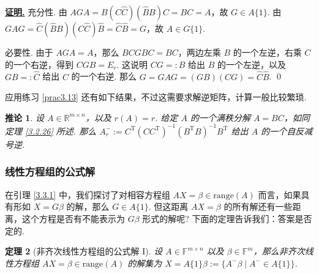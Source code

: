 \documentclass[10pt,openany]{article}
\theoremstyle{thmstyle} %
\newtheorem{theorem}{定理}[subsection]
\theoremstyle{defstyle} %
\newtheorem{corollary}[theorem]{推论}
\theoremstyle{prostyle} %
\theoremstyle{exastyle}
\theoremstyle{remstyle}
\renewenvironment{proof}[1][证明]{\par\underline{\textbf{#1.}} \;\fangsong}{\qed\par}
\newcommand{\T}{^{\text{T}}}
\newcommand{\F}{\mathbb{F}}
\newcommand{\R}{\mathbb{R}}
\newcommand{\mn}{^{m \times n}}
\begin{document}
\begin{proof}
	充分性. 由 \( AGA=B(C\hat{C})(\hat{B}B)C=BC=A \)，故 \( G \in A\{1\} \). 由 \( GAG=\hat{C}(\hat{B}B)(C\hat{C})\hat{B}=\hat{C}\hat{B}=G \)，故 \( A \in G\{1\} \). 
	
	必要性. 由于 \( AGA=A \)，那么 \( BCGBC=BC \)，两边左乘 \( B \) 的一个左逆，右乘 \( C \) 的一个右逆，得到 \( CGB=E_r \). 这说明 \( CG=:\hat{B} \) 给出 \( B \) 的一个左逆，以及 \( GB=:\hat{C} \) 给出 \( C \) 的一个右逆. 那么 \( G=GAG=(GB)(CG)=\hat{C}\hat{B} \).
\end{proof}

应用练习 \ref{prac3.13} 还有如下结果，不过这需要求解逆矩阵，计算一般比较繁琐.

\begin{corollary}
	设 \( A \in \R\mn \)，以及 \( r(A)=r \). 给定 \( A \) 的一个满秩分解 \( A=BC \)，如同定理 \ref{3.2.26} 所述. 那么 \( A_r^{-}:=C\T (CC\T)^{-1}(B\T B)^{-1} B\T \) 给出 \( A \) 的一个自反减号逆.
\end{corollary}

\subsubsection{线性方程组的公式解}

在引理 \ref{3.3.1} 中，我们探讨了对相容方程组 \( AX=\beta \in \text{range}(A) \) 而言，如果具有形如 \( X=G\beta \) 的解，那么 \( G \in A\{1 \} \). 但这距离 \( AX=\beta \) 的所有解还有一些距离，这个方程是否有不能表示为 \( G\beta \) 形式的解呢? 下面的定理告诉我们：答案是否定的.


\begin{theorem}[非齐次线性方程组的公式解 I] \label{3.3.13}
	设 \( A \in \F\mn \) 以及 \( \beta \in \F^m \)，那么非齐次线性方程组 \( AX=\beta \in \text{range}(A) \) 的解集为 \( X=A\{1\}\beta:=\{A^{-}\beta\mid A^{-} \in A\{1\}\} \). 
\end{theorem}
\end{document}
